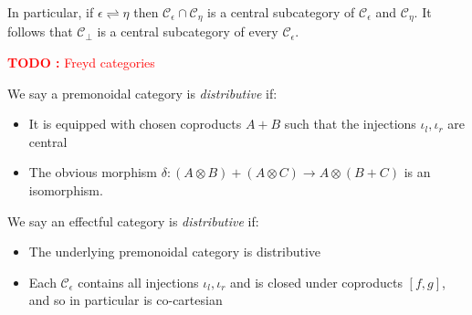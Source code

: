 \documentclass[acmsmall,screen,review]{acmart}
\newcounter{todos}
\newcommand{\TODO}[1]{{
  \stepcounter{todos}
  \begin{center}\large{\textcolor{red}{\textbf{TODO \arabic{todos}:} #1}}\end{center}
}}
\newcommand{\mc}[1]{\ensuremath{\mathcal{#1}}}
\newcommand{\slides}{\rightleftharpoons}
\begin{document}
In particular, if $\epsilon \slides \eta$ then $\mc{C}_\epsilon \cap \mc{C}_\eta$ is a central
subcategory of $\mc{C}_\epsilon$ and $\mc{C}_\eta$. It follows that $\mc{C}_\bot$ is a central
subcategory of every $\mc{C}_\epsilon$.

\TODO{Freyd categories}

\begin{definition}
  We say a premonoidal category is \emph{distributive} if:
  \begin{itemize}
    \item It is equipped with chosen coproducts $A + B$ such that the injections $\iota_l, \iota_r$
    are central
    \item The obvious morphism $\delta : (A \otimes B) + (A \otimes C) \to A \otimes (B + C)$ is an
    isomorphism.
  \end{itemize}
\end{definition}

\begin{definition}
  We say an effectful category is \emph{distributive} if:
  \begin{itemize}
    \item The underlying premonoidal category is distributive
    \item Each $\mc{C}_\epsilon$ contains all injections $\iota_l, \iota_r$ and is closed under
    coproducts $[f, g]$, and so in particular is co-cartesian
  \end{itemize}
\end{definition}
\end{document}
